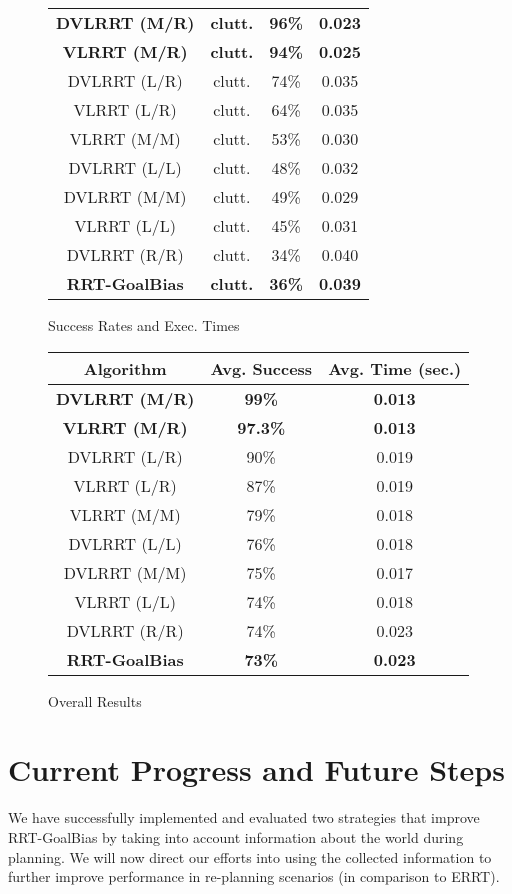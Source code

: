 \documentclass[10pt,twoside,twocolumn]{article}
\begin{document}
\begin{figure}[tp]
\begin{center}
{\begin{tabular}{|cccc|}
\hline
\bf{DVLRRT (M/R)} & \bf{clutt.} & \bf{96\%} & \bf{0.023}\\
\bf{VLRRT (M/R)} & \bf{clutt.} & \bf{94\%} & \bf{0.025} \\
DVLRRT (L/R) & clutt. & 74\% & 0.035 \\
VLRRT (L/R) & clutt. & 64\% & 0.035\\
VLRRT (M/M) & clutt. & 53\% & 0.030\\
DVLRRT (L/L) & clutt. & 48\% & 0.032\\
DVLRRT (M/M) & clutt. & 49\% & 0.029\\
VLRRT (L/L) & clutt. & 45\% & 0.031\\
DVLRRT (R/R) & clutt. & 34\% & 0.040\\
\bf{RRT-GoalBias} & \bf{clutt.} & \bf{36\%} & \bf{0.039}\\
\hline
\end{tabular}}
\end{center}
\caption{Success Rates and Exec. Times}
\end{figure}
\begin{figure}[tp]
\begin{center}
\footnotesize{
\begin{tabular}{|ccc|}
\hline
Algorithm & Avg. Success & Avg. Time (sec.)\\
\hline
\bf{DVLRRT (M/R)} & \bf{99\%} & \bf{0.013}\\
\bf{VLRRT (M/R)} & \bf{97.3\%} & \bf{0.013}\\
DVLRRT (L/R) & 90\% & 0.019\\
VLRRT (L/R) & 87\% & 0.019\\
VLRRT (M/M) & 79\% & 0.018\\
DVLRRT (L/L) & 76\% & 0.018\\
DVLRRT (M/M) & 75\% & 0.017\\
VLRRT (L/L) & 74\% & 0.018\\
DVLRRT (R/R) & 74\% & 0.023\\
\bf{RRT-GoalBias} & \bf{73\%} & \bf{0.023}\\
\hline
\end{tabular}}
\end{center}
\caption{Overall Results}
\end{figure}

\section{Current Progress and Future Steps}

We have successfully implemented and evaluated two strategies that improve RRT-GoalBias by
taking into account information about the world during planning. We will now
direct our efforts into using the collected information to further improve performance
in re-planning scenarios (in comparison to ERRT). 
\end{document}

